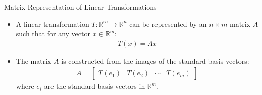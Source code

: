 \begin{frame}{Matrix Representation of Linear Transformations}
\begin{itemize}
    \item A linear transformation $T:\mathbb{R}^m \rightarrow \mathbb{R}^n$ can be represented by an $n\times m$ matrix $A$ such that for any vector $x\in \mathbb{R}^m$:
    \begin{align*}
        T(x) = Ax
    \end{align*}
    \item The matrix $A$ is constructed from the images of the standard basis vectors:
    \begin{align*}
        A = \begin{bmatrix}
            T(e_1) & T(e_2) & \cdots & T(e_m)
        \end{bmatrix}
    \end{align*}    
    where $e_i$ are the standard basis vectors in $\mathbb{R}^m$.
\end{itemize}
\end{frame}


